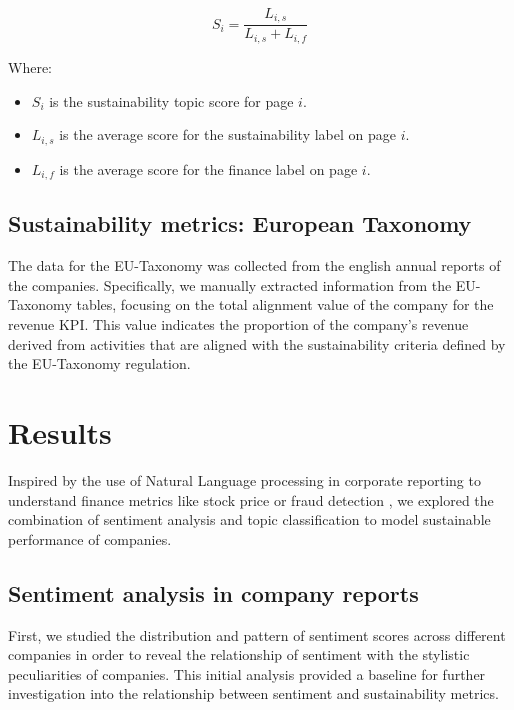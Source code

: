 \documentclass[times]{oupau}
\begin{document}
\begin{equation}
S_{i} = \frac{L_{i,s}}{L_{i,s} + L_{i,f}}
\end{equation}

Where:
\begin{itemize}
  \item $S_{i}$ is the sustainability topic score for page $i$.
  \item $L_{i,s}$ is the average score for the sustainability label on page $i$.
  \item $L_{i,f}$ is the average score for the finance label on page $i$.
\end{itemize}
\par
\justify

\subsection{Sustainability metrics: European Taxonomy}

The data for the EU-Taxonomy was collected from the english annual reports of the companies. Specifically, we manually extracted information from the EU-Taxonomy tables, focusing on the total alignment value of the company for the revenue KPI. This value indicates the proportion of the company's revenue derived from activities that are aligned with the sustainability criteria defined by the EU-Taxonomy regulation.


\section{Results}

Inspired by the use of Natural Language processing in corporate reporting to understand finance metrics like stock price \cite{stocks} or fraud detection \cite{gokturk2022}, we explored the combination of sentiment analysis and topic classification to model sustainable performance of companies.


\subsection{Sentiment analysis in company reports}
First, we studied the distribution and pattern of sentiment scores across different companies in order to reveal the relationship of sentiment with the stylistic peculiarities of companies. This initial analysis provided a baseline for further investigation into the relationship between sentiment and sustainability metrics.
\end{document}
